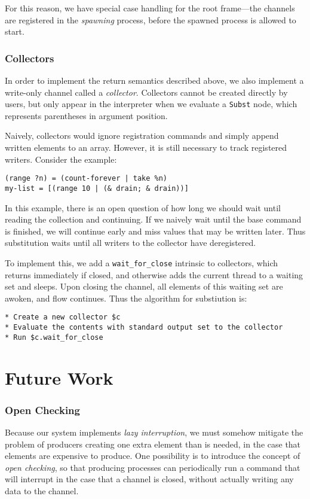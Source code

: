 \documentclass[english,preprint,JIP,uplatex]{ipsj}
\begin{document}
For this reason, we have special case handling for the root frame---the channels are registered in the \emph{spawning} process, before the spawned process is allowed to start.

\subsubsection{Collectors}\noindent
In order to implement the return semantics described above, we also implement a write-only channel called a \emph{collector}. Collectors cannot be created directly by users, but only appear in the interpreter when we evaluate a \verb/Subst/ node, which represents parentheses in argument position.

Naively, collectors would ignore registration commands and simply append written elements to an array. However, it is still necessary to track registered writers. Consider the example:
\begin{lstlisting}
(range ?n) = (count-forever | take %n)
my-list = [(range 10 | (& drain; & drain))]
\end{lstlisting}

\noindent
In this example, there is an open question of how long we should wait until reading the collection and continuing. If we naively wait until the base command is finished, we will continue early and miss values that may be written later. Thus substitution waits until all writers to the collector have deregistered.

To implement this, we add a \verb/wait_for_close/ intrinsic to collectors, which returns immediately if closed, and otherwise adds the current thread to a waiting set and sleeps. Upon closing the channel, all elements of this waiting set are awoken, and flow continues. Thus the algorithm for substiution is:
\begin{lstlisting}
* Create a new collector $c
* Evaluate the contents with standard output set to the collector
* Run $c.wait_for_close
\end{lstlisting}

\section{Future Work}\label{future-work}

\subsubsection{Open Checking}\noindent
Because our system implements \emph{lazy interruption}, we must somehow mitigate the problem of producers creating one extra element than is needed, in the case that elements are expensive to produce. One possibility is to introduce the concept of \emph{open checking}, so that producing processes can periodically run a command that will interrupt in the case that a channel is closed, without actually writing any data to the channel.
\end{document}
